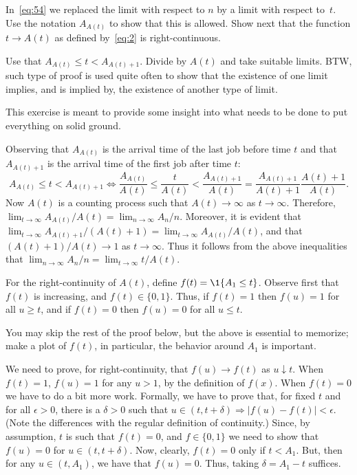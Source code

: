 \begin{extra}
 In~\cref{eq:54} we replaced the limit with respect to $n$ by a limit with respect to~$t$.
 Use the notation $A_{A(t)}$ to show that this is allowed.
 Show next that the function $t\to A(t)$ as defined by~\cref{eq:2} is right-continuous.
\begin{hint}
 Use that $A_{A(t)} \leq t < A_{A(t)+1}$.
 Divide by $A(t)$ and take suitable limits.
 BTW, such type of proof is used quite often to show that the existence of one limit implies, and is implied by, the existence of another type of limit.
\end{hint}
\begin{solution}
 This exercise is meant to provide some insight into what needs to be done to put everything on solid ground.


 Observing that $A_{A(t)}$ is the arrival time of the last job before time $t$ and that $A_{A(t)+1}$ is the arrival time of the first job after time $t$:
 \begin{equation*}
 A_{A(t)} \leq t < A_{A(t)+1} \Leftrightarrow 
 \frac{A_{A(t)}} {A(t)} \leq \frac{t}{A(t)} <\frac{A_{A(t)+1}}{A(t)} = \frac{A_{A(t)+1}}{A(t)+1}\frac{A(t)+1}{A(t)}.
 \end{equation*}
 Now $A(t)$ is a counting process such that $A(t)\to\infty$ as $t\to\infty$.
 Therefore, $\lim_{t\to\infty} A_{A(t)}/A(t) = \lim_{n\to\infty} A_n/n$.
 Moreover, it is evident that $\lim_{t\to\infty} A_{A(t)+1}/(A(t)+1) = \lim_{t\to\infty} A_{A(t)}/A(t)$, and that $(A(t)+1)/A(t)\to 1$ as $t\to\infty$.
 Thus it follows from the above inequalities that $\lim_{n\to\infty} A_n/n = \lim_{t\to\infty} t/A(t)$.
 
 For the right-continuity of $A(t)$, define $f(t) = \1{A_1 \leq t}$.
 Observe first that $f(t)$ is increasing, and $f(t)\in\{0,1\}$.
 Thus, if $f(t)=1$ then $f(u)=1$ for all $u\geq t$, and if $f(t)=0$ then $f(u) = 0$ for all $u\leq t$.

 You may skip the rest of the proof below, but the above is essential to memorize; make a plot of $f(t)$, in particular, the behavior around $A_1$ is important.

 We need to prove, for right-continuity, that $f(u)\to f(t) $ as $u\downarrow t$.
 When $f(t)=1$, $f(u)=1$ for any $u>1$, by the definition of $f(x)$.
 When $f(t)=0$ we have to do a bit more work.
 Formally, we have to prove that, for fixed $t$ and for all $\epsilon > 0$, there is a $\delta>0$ such that $u\in(t, t+\delta) \Rightarrow |f(u) -f(t)| < \epsilon$.
 (Note the differences with the regular definition of continuity.)
 Since, by assumption, $t$ is such that $f(t)=0$, and $f\in\{0,1\}$ we need to show that $f(u)=0$ for $u\in(t, t+\delta)$.
 Now, clearly, $f(t)=0$ only if $t < A_1$.
 But, then for any $u\in(t, A_1)$, we have that $f(u) = 0$.
 Thus, taking $\delta = A_1 - t$ suffices.


\end{solution}
\end{extra}
